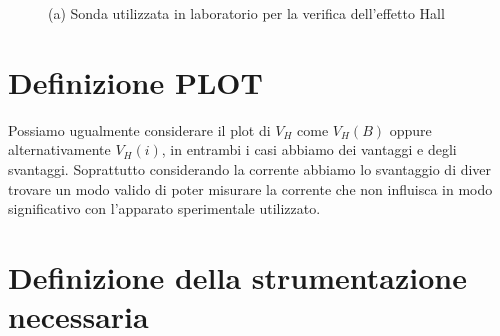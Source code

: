\documentclass[fleqn,varvw]{memo}
\begin{document}
\begin{figure}
    \caption{(a) Sonda utilizzata in laboratorio per la verifica dell'effetto Hall}\label{fig:1}
\end{figure}

\section{Definizione PLOT}

Possiamo ugualmente considerare il plot di $V_H$ come $V_H(B)$ oppure alternativamente $V_H(i)$, in entrambi i casi abbiamo dei vantaggi e degli svantaggi. Soprattutto considerando la corrente abbiamo lo svantaggio di diver trovare un modo valido di poter misurare la corrente che non influisca in modo significativo con l'apparato sperimentale utilizzato.

\section{Definizione della strumentazione necessaria}
\end{document}
